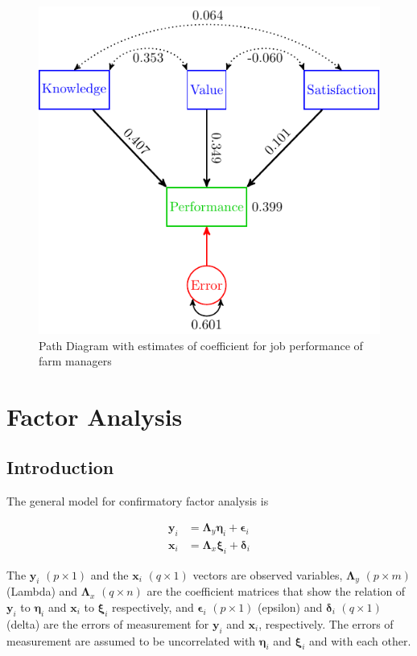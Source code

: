 \begin{figure}[H]

{\centering \includegraphics[width=0.8\linewidth]{images/Warren5V1Values} 

}

\caption{Path Diagram with estimates of coefficient for job performance of farm managers}\label{fig:Warren5V1Values}
\end{figure}

\hypertarget{FA}{%
\chapter{Factor Analysis}\label{FA}}

\hypertarget{introduction-3}{%
\section{Introduction}\label{introduction-3}}

The general model for confirmatory factor analysis is

\begin{align}
\mathbf{y}_{i} & =\bm{\Lambda}_{y}\bm{\eta}_{i}+\bm{\epsilon}_{i}\label{eq:MeasurementModel1}\\
\mathbf{x}_{i} & =\bm{\Lambda}_{x}\bm{\xi}_{i}+\bm{\delta}_{i}\label{eq:MeasurementModel2}
\end{align}

The \(\mathbf{y}_{i}\) \(\left(p\times1\right)\) and the \(\mathbf{x}_{i}\)
\(\left(q\times1\right)\) vectors are observed variables, \(\bm{\Lambda}_{y}\)
\(\left(p\times m\right)\) (Lambda) and \(\bm{\Lambda}_{x}\) \(\left(q\times n\right)\)
are the coefficient matrices that show the relation of \(\mathbf{y}_{i}\)
to \(\bm{\eta}_{i}\) and \(\mathbf{x}_{i}\) to \(\bm{\xi}_{i}\) respectively,
and \(\bm{\epsilon}_{i}\) \(\left(p\times1\right)\) (epsilon) and \(\bm{\delta}_{i}\)
\(\left(q\times1\right)\) (delta) are the errors of measurement for
\(\mathbf{y}_{i}\) and \(\mathbf{x}_{i}\), respectively. The errors
of measurement are assumed to be uncorrelated with \(\bm{\eta}_{i}\) and
\(\bm{\xi}_{i}\) and with each other.


